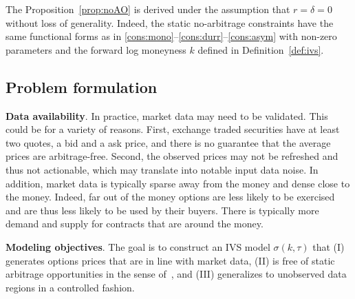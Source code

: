 \begin{remark}
The Proposition~\ref{prop:noAO} is derived under the assumption that $r=\delta=0$ without loss of generality.
Indeed, the static no-arbitrage constraints have the same functional forms as in \ref{cons:mono}--\ref{cons:durr}--\ref{cons:asym} with non-zero parameters and the forward log moneyness $k$ defined in Definition~\ref{def:ivs}. 
\end{remark}

\subsection{Problem formulation}

\textbf{Data availability}.
In practice, market data may need to be validated.
This could be for a variety of reasons.
First, exchange traded securities have at least two quotes, a bid and a ask price, and there is no guarantee that the average prices are arbitrage-free.
Second, the observed prices may not be refreshed and thus not actionable, which may translate into notable input data noise.
In addition, market data is typically sparse away from the money and dense close to the money.
Indeed, far out of the money options are less likely to be exercised and are thus less likely to be used by their buyers.
There is typically more demand and supply for contracts that are around the money.

\textbf{Modeling objectives}.
The goal is to construct an IVS model $\sigma(k,\tau)$ that (I)
generates options prices that are in line with market data,
(II) is free of static arbitrage opportunities in the sense of~,
and (III) generalizes to unobserved data regions in a controlled fashion.
